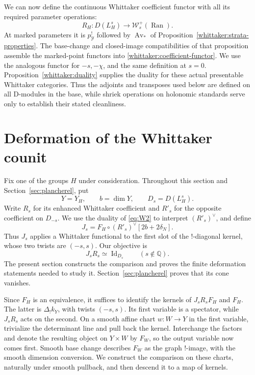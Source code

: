 \documentclass[11pt]{article}
\numberwithin{equation}{section}
\theoremstyle{definition}
\theoremstyle{remark}
\begin{document}
We can now define the continuous Whittaker coefficient functor with all
its required parameter operations:
\begin{equation}\label{whittaker:coefficient-functor}
 R_H:D(L_H^s)\longrightarrow\mathcal W_s^+(\operatorname{Ran}).
\end{equation}
At marked parameters it is $p_{\mathcal Y}^!$ followed by
$\operatorname{Av}_*$ of Proposition~\ref{whittaker:strata-properties}.
The base-change and closed-image compatibilities of that proposition
assemble the marked-point functors into \eqref{whittaker:coefficient-functor}.
We use the analogous functor for $-s,-\chi$, and the same definition at
$s=0$. Proposition~\ref{whittaker:duality} supplies the duality for these
actual presentable Whittaker categories. Thus the adjoints and transposes
used below are defined on all D-modules in the base, while shriek
operations on holonomic standards serve only to establish their stated
cleanliness.

\section{Deformation of the Whittaker counit}\label{sec:deformation}

Fix one of the groups $H$ under consideration.  Throughout this section and
Section~\ref{sec:plancherel}, put
\[
 Y=Y_H,\qquad b=\dim Y,\qquad D_s=D(L_H^s).
\]
Write $R_s$ for its enhanced Whittaker coefficient and $R'_s$ for the
opposite coefficient on $D_{-s}$.  We use the duality of
\eqref{eq:W2} to interpret $(R'_s)^\vee$, and define
\[
 J_s=F_H\circ(R'_s)^\vee[2b+2\delta_N].
\]
Thus $J_s$ applies a Whittaker functional to the first slot of the
$!$-diagonal kernel, whose two twists are $(-s,s)$.  Our objective is
\begin{equation}\label{eq:P1}
                         J_sR_s\simeq\operatorname{Id}_{D_s}
                         \qquad(s\notin\mathbb Q).
\end{equation}
The present section constructs the comparison and proves the finite
deformation statements needed to study it.  Section~\ref{sec:plancherel}
proves that its cone vanishes.

Since $F_H$ is an equivalence, it suffices to identify the kernels of
$J_sR_sF_H$ and $F_H$.  The latter is $\Delta_!k_Y$, with twists
$(-s,s)$.  Its first variable is a spectator, while $J_sR_s$ acts on the
second.  On a smooth affine chart $w:W\to Y$ in the first variable,
trivialize the determinant line and pull back the kernel.  Interchange
the factors and denote the resulting object on $Y\times W$ by $F_W$,
so the output variable now comes first.  Smooth base change describes
$F_W$ as the graph $!$-image, with
the smooth dimension conversion.  We construct the comparison on these
charts, naturally under smooth pullback, and then descend it to a map
of kernels.
\end{document}
